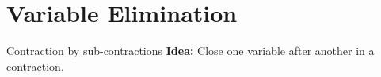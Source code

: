 \documentclass{beamer}
\begin{document}
    {\frame[plain]{\titlepage}}
    \showoutlineatsection


    \section{Variable Elimination}

    \begin{frame}{Contraction by sub-contractions}
        {\bf Idea:} Close one variable after another in a contraction.

    \end{frame}
\end{document}
